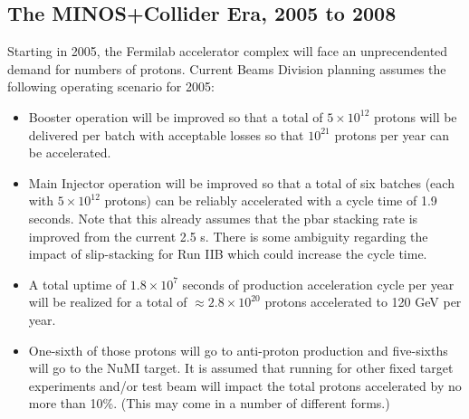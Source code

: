 \documentclass{article}
\begin{document}
\subsection {The MINOS+Collider Era, 2005 to 2008}

Starting in 2005, the Fermilab accelerator complex will face an unprecendented
demand for numbers of protons. 
Current Beams Division planning assumes the following
operating scenario for 2005:
\begin {itemize}
\item Booster operation will be improved so that a total of $5\times 10^{12}$
protons will be delivered per batch with acceptable losses so that
$10^{21}$ protons per year can be accelerated.
\item Main Injector operation will be improved so that a total of six
batches (each with $5\times 10^{12}$ protons) can be reliably accelerated
with a cycle time of 1.9 seconds. Note that this already assumes that the pbar
stacking rate is improved from the current 2.5 s.
There is some ambiguity regarding
the impact of slip-stacking for Run IIB which could increase the cycle time.
\item A total uptime of $1.8\times10^7$ seconds of production acceleration
cycle per year will be realized for a total of $\approx 2.8 \times 10^{20}$
protons accelerated to 120 GeV per year. 
\item One-sixth of those protons will go to anti-proton production and
five-sixths will go to the NuMI target. It is assumed that
running for other fixed target experiments and/or test beam will impact
the total protons accelerated by no more than 10\%. (This may come in
a number of different forms.) 
\end {itemize}
\end{document}
